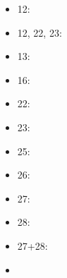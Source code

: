 \documentclass{ifacconf}
\begin{document}
\begin{itemize}
  \item 12: \cite{bi:12}
  \item 12, 22, 23: \cite{bi:12,bi:22,bi:23}
  \item 13: \cite{bi:13}
  \item 16: \cite{bi:16}
  \item 22: \cite{bi:22}
  \item 23: \cite{bi:23}
  \item 25: \cite{bi:25}
  \item 26: \cite{bi:26}
  \item 27: \cite{bi:27}
  \item 28: \cite{bi:28}
  \item 27+28: \cite{bi:27,bi:28}
  \item \cite{bi:salman}
\end{itemize}
  
\end{document}
